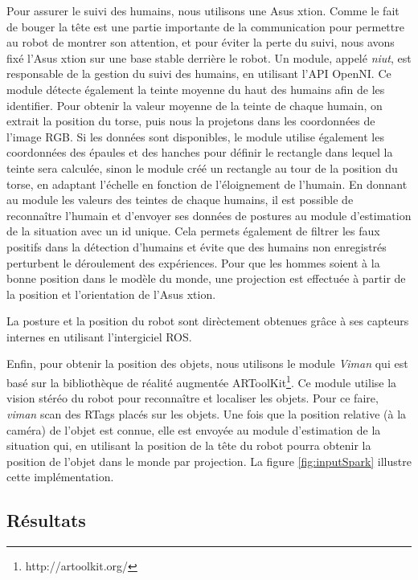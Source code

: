 \documentclass[a4paper,11pt,twoside]{StyleThese}
\begin{document}
Pour assurer le suivi des humains, nous utilisons une Asus xtion. Comme le fait de bouger la tête est une partie importante de la communication pour permettre au robot de montrer son attention, et pour éviter la perte du suivi, nous avons fixé l'Asus xtion sur une base stable derrière le robot.
Un module, appelé \textit{niut}, est responsable de la gestion du suivi des humains, en utilisant l'API OpenNI. Ce module détecte également la teinte moyenne du haut des humains afin de les identifier. Pour obtenir la valeur moyenne de la teinte de chaque humain, on extrait la position du torse, puis nous la projetons dans les coordonnées de l'image RGB. Si les données sont disponibles, le module utilise également les coordonnées des épaules et des hanches pour définir le rectangle dans lequel la teinte sera calculée, sinon le module créé un rectangle au tour de la position du torse, en adaptant l'échelle en fonction de l'éloignement de l'humain.
En donnant au module les valeurs des teintes de chaque humains, il est possible de reconnaître l'humain et d'envoyer ses données de postures au module d'estimation de la situation avec un id unique. Cela permets également de filtrer les faux positifs dans la détection d'humains et évite que des humains non enregistrés perturbent le déroulement des expériences.
Pour que les hommes soient à la bonne position dans le modèle du monde, une projection est effectuée à partir de la position et l'orientation de l'Asus xtion.

La posture et la position du robot sont dirèctement obtenues grâce à ses capteurs internes en utilisant l'intergiciel ROS.

Enfin, pour obtenir la position des objets, nous utilisons le module \textit{Viman} qui est basé sur la bibliothèque de réalité augmentée ARToolKit\footnote{http://artoolkit.org/}. Ce module utilise la vision stéréo du robot pour reconnaître et localiser les objets. Pour ce faire, \textit{viman} scan des RTags placés sur les objets.
Une fois que la position relative (à la caméra) de l'objet est connue, elle est envoyée au module d'estimation de la situation qui, en utilisant la position de la tête du robot pourra obtenir la position de l'objet dans le monde par projection.
La figure \ref{fig:inputSpark} illustre cette implémentation.


\subsection{Résultats}
\end{document}
